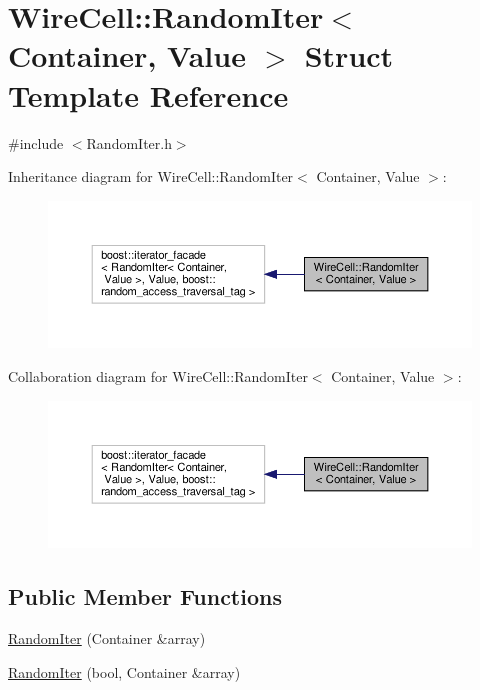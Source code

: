 \hypertarget{struct_wire_cell_1_1_random_iter}{}\section{Wire\+Cell\+:\+:Random\+Iter$<$ Container, Value $>$ Struct Template Reference}
\label{struct_wire_cell_1_1_random_iter}


{\ttfamily \#include $<$Random\+Iter.\+h$>$}



Inheritance diagram for Wire\+Cell\+:\+:Random\+Iter$<$ Container, Value $>$\+:
\nopagebreak
\begin{figure}[H]
\begin{center}
\leavevmode
\includegraphics[width=350pt]{struct_wire_cell_1_1_random_iter__inherit__graph}
\end{center}
\end{figure}


Collaboration diagram for Wire\+Cell\+:\+:Random\+Iter$<$ Container, Value $>$\+:
\nopagebreak
\begin{figure}[H]
\begin{center}
\leavevmode
\includegraphics[width=350pt]{struct_wire_cell_1_1_random_iter__coll__graph}
\end{center}
\end{figure}
\subsection*{Public Member Functions}
\begin{DoxyCompactItemize}
\item 
\hyperlink{struct_wire_cell_1_1_random_iter_add59ce09e0022afcb5b2eaaab175b2ff}{Random\+Iter} (Container \&array)
\item 
\hyperlink{struct_wire_cell_1_1_random_iter_ad4ddcd5508b01ca78b971762a6375627}{Random\+Iter} (bool, Container \&array)
\end{DoxyCompactItemize}
